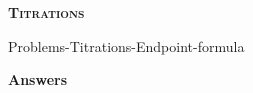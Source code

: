 \documentclass[main.tex]{subfiles}
\newcommand\chapterlabel{Ch-acidbase}
\begin{document}
\begin{multicols*}{2}
{\raggedright\textsc{\textbf{Titrations}}\par}
 {Problems-Titrations-Endpoint-formula}

%

\end{multicols*}


\newpage \begin{answerbox}
\begin{answersenvironment}
 \begin{localsize}{10}
{\Large \bf Answers}
  \printsolutions[byID={1,3,5,7,9,11,13,15,17,19,21,23,25,27,29,31,33,35,37, 39, 41, 43, 45, 47, 49, 51,53,55,57,59}]
 \end{localsize}
 \end{answersenvironment}
\end{answerbox}
\end{document}
